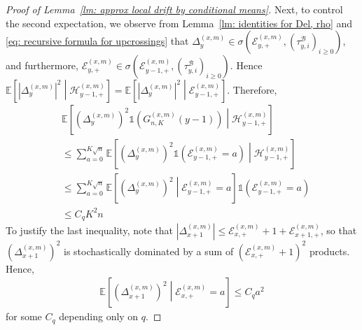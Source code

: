 \documentclass[EJP]{ejpecp} %
\newcommand{\abs}[1]{\left\vert #1 \right\vert}
\begin{document}
\begin{proof}[Proof of Lemma~\ref{lm: approx local drift by conditional means}]
	Next, to control the second expectation, we observe from Lemma~\ref{lm: identities for Del, rho} and \eqref{eq: recursive formula for upcrossings} that $\Delta_y^{(x,m)} \in \sigma \left(\mathcal{E}_{y, +}^{(x,m)}, (\tau_{y,i}^{\mathscr{B}})_{i \ge 0}\right)$, and furthermore, $\mathcal{E}_{y, +}^{(x,m)} \in \sigma \left(\mathcal{E}_{y-1, +}^{(x,m)}, (\tau_{y,i}^{\mathscr{B}})_{i \ge 0}\right)$. Hence $\mathbb{E}\left[|\Delta_y^{(x,m)}|^2 \middle| \mathcal{H}_{y-1, +}^{(x,m)}\right] = \mathbb{E}\left[|\Delta_y^{(x,m)}|^2 \middle| \mathcal{E}_{y-1, +}^{(x,m)}\right]$. Therefore,
	\begin{align*}
		& \mathbb{E}\left[ \left(\Delta_y^{(x,m)}\right)^2 \mathbb{1}\left(G_{n, K}^{(x,m)}(y-1)\right) \middle| \mathcal{H}_{y-1, +}^{(x,m)}  \right] \\
		&\le \sum_{a = 0}^{K \sqrt{n}} \mathbb{E}\left[ \left(\Delta_y^{(x,m)}\right)^2 \mathbb{1}\left( \mathcal{E}_{y-1, +}^{(x,m)} = a \right) \middle| \mathcal{H}_{y-1, +}^{(x,m)} \right] \\
		&\le \sum_{a = 0}^{K \sqrt{n}} \mathbb{E}\left[ \left(\Delta_y^{(x,m)}\right)^2 \middle| \mathcal{E}_{y-1, +}^{(x,m)} = a \right] \mathbb{1}\left( \mathcal{E}_{y-1, +}^{(x,m)} = a \right) \\
		&\le C_q K^2 n
	\end{align*}
	To justify the last inequality, note that $\abs{\Delta_{x+1}^{(x,m)}} \leq  \mathcal{E}_{x,+}^{(x,m)}+1 + \mathcal{E}_{x+1,+}^{(x,m)}$,  
	so that $ \left(\Delta_{x+1}^{(x,m)} \right)^2$ is stochastically dominated by a sum of $\left(\mathcal{E}_{x,+}^{(x,m)}+1\right)^2$ products. Hence,
	\begin{align*}
		\mathbb{E}\left[ \left(\Delta_{x+1}^{(x,m)}\right)^2 \middle| \mathcal{E}_{x,+}^{(x,m)} = a  \right]  \leq C_q a^2
	\end{align*}
	for some $C_q$ depending only on $q$.



\end{proof}
\end{document}
